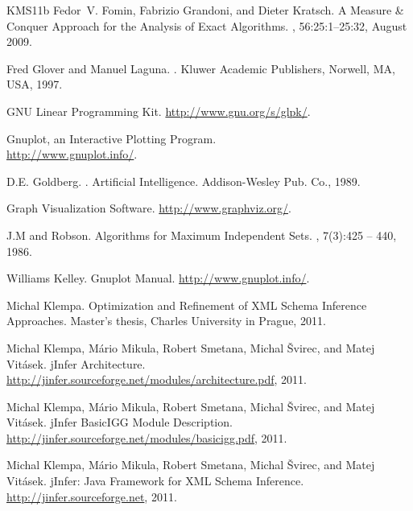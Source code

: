 \begin{thebibliography}{KMS{\etalchar{+}}11b}
Fedor~V. Fomin, Fabrizio Grandoni, and Dieter Kratsch.
\newblock A Measure \& Conquer Approach for the Analysis of Exact Algorithms.
, 56:25:1--25:32, August 2009.

Fred Glover and Manuel Laguna.
.
\newblock Kluwer Academic Publishers, Norwell, MA, USA, 1997.

GNU Linear Programming Kit.
\newblock \url{http://www.gnu.org/s/glpk/}.

Gnuplot, an Interactive Plotting Program.\\
\newblock \url{http://www.gnuplot.info/}.

D.E. Goldberg.
.
\newblock Artificial Intelligence. Addison-Wesley Pub. Co., 1989.

Graph Visualization Software.
\newblock \url{http://www.graphviz.org/}.

J.M and Robson.
\newblock Algorithms for Maximum Independent Sets.
, 7(3):425 -- 440, 1986.

Williams Kelley.
\newblock Gnuplot Manual.
\newblock \url{http://www.gnuplot.info/}.

Michal Klempa.
\newblock Optimization and Refinement of XML Schema Inference Approaches.
\newblock Master's thesis, Charles University in Prague, 2011.

Michal Klempa, M\'{a}rio Mikula, Robert Smetana, Michal \v{S}virec, and Matej Vit\'{a}sek.
\newblock jInfer Architecture.\\
\newblock \url{http://jinfer.sourceforge.net/modules/architecture.pdf}, 2011.

Michal Klempa, M\'{a}rio Mikula, Robert Smetana, Michal \v{S}virec, and Matej Vit\'{a}sek.
\newblock jInfer BasicIGG Module Description.\\
\newblock \url{http://jinfer.sourceforge.net/modules/basicigg.pdf}, 2011.

Michal Klempa, M\'{a}rio Mikula, Robert Smetana, Michal \v{S}virec, and Matej Vit\'{a}sek.
\newblock jInfer: Java Framework for XML Schema Inference.\\
\newblock \url{http://jinfer.sourceforge.net}, 2011.


\end{thebibliography}
